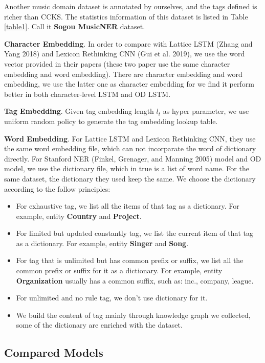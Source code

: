 \documentclass[letterpaper]{article} %
\begin{document}
Another music domain dataset is annotated by ourselves, and the tags defined is richer than CCKS. The statistics information of this dataset is listed in Table \ref{table1}. Call it \textbf{Sogou MusicNER} dataset.

\textbf{Character Embedding}. In order to compare with Lattice LSTM (Zhang and Yang 2018) and Lexicon Rethinking CNN (Gui et al. 2019), we use the word vector provided in their papers (these two paper use the same character embedding and word embedding). There are character embedding and word embedding, we use the latter one as character embedding for we find it perform better in both character-level LSTM and OD LSTM.

\textbf{Tag Embedding}. Given tag embedding length $l_t$ as hyper parameter, we use uniform random policy to generate the tag embedding lookup table. 

\textbf{Word Embedding}. For Lattice LSTM and Lexicon Rethinking CNN, they use the same word embedding file, which can not incorparate the word of dictionary directly. For Stanford NER (Finkel, Grenager, and Manning 2005) model and OD model, we use the dictionary file, which in true is a list of word name. For the same dataset, the dictionary they used keep the same. We choose the dictionary according to the follow principles:

\begin{itemize}
\item For exhaustive tag, we list all the items of that tag as a dictionary. For example, entity \textbf{Country} and \textbf{Project}.
\item For limited but updated constantly tag, we list the current item of that tag as a dictionary. For example, entity \textbf{Singer} and \textbf{Song}.
\item For tag that is unlimited but has common prefix or suffix, we list all the common prefix or suffix for it as a dictionary. For example, entity \textbf{Organization} usually has a common suffix, such as: inc., company, league.
\item For unlimited and no rule tag, we don't use dictionary for it.
\item We build the content of tag mainly through knowledge graph we collected, some of the dictionary are enriched with the dataset.
\end{itemize}

\subsection{Compared Models}
\end{document}
